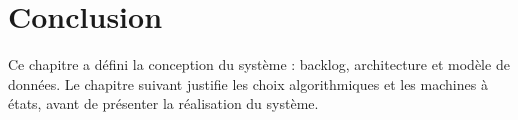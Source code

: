 \section*{Conclusion}
\justifying
{}
{}

Ce chapitre a défini la conception du système : backlog, architecture et modèle de données. Le chapitre suivant justifie les choix algorithmiques et les machines à états, avant de présenter la réalisation du système.
